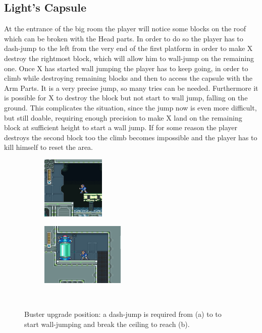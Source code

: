 \subsection{Light's Capsule}
At the entrance of the big room the player will notice some blocks on the roof which can be broken with the Head parts. In order to do so the player has to dash-jump to the left from the very end of the first platform in order to make X destroy the rightmost block, which will allow him to wall-jump on the remaining one. Once X has started wall jumping the player has to keep going, in order to climb while destroying remaining blocks and then to access the capsule with the Arm Parts. It is a very precise jump, so many tries can be needed. Furthermore it is possible for X to destroy the block but not start to wall jump, falling on the ground. This complicates the situation, since the jump now is even more difficult, but still doable, requiring enough precision to make X land on the remaining block at sufficient height to start a wall jump. If for some reason the player destroys the second block too the climb becomes impossible and the player has to kill himself to reset the area.
\begin{figure}[h]
	\centering
	\begin{subfigure}{0.4\textwidth}
		\centering
		\includegraphics[height=3cm]{figures/X1/Flame_mammoth/Flame_armor_1.jpg}
		\caption{}
	\end{subfigure}
	\begin{subfigure}{0.4\textwidth}
		\centering
		\includegraphics[height=3cm]{figures/X1/Flame_mammoth/Flame_armor_2.jpg}
		\caption{}
	\end{subfigure}\\
	\caption{Buster upgrade position: a dash-jump is required from (a) to to start wall-jumping and break the ceiling to reach (b).}
\end{figure}

